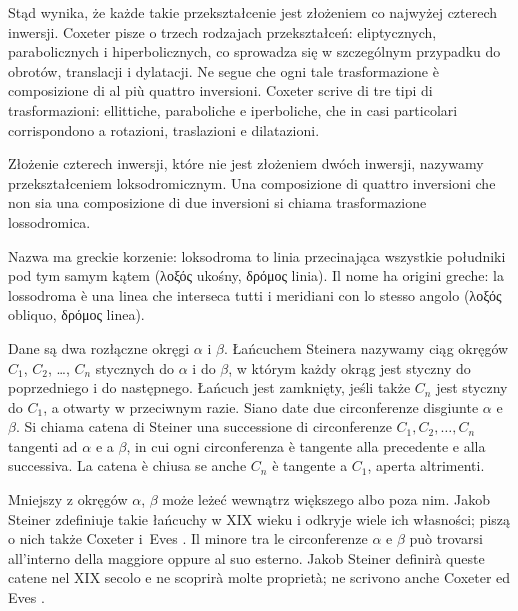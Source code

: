 Stąd wynika, że każde takie przekształcenie jest złożeniem co najwyżej czterech inwersji. %
Coxeter \cite[s. 108]{coxeter_1967} pisze o trzech rodzajach przekształceń: eliptycznych, parabolicznych i hiperbolicznych, co sprowadza się w szczególnym przypadku do obrotów, translacji i dylatacji. %
Ne segue che ogni tale trasformazione è composizione di al più quattro inversioni. %
Coxeter \cite[p. 108]{coxeter_1967} scrive di tre tipi di trasformazioni: ellittiche, paraboliche e iperboliche, che in casi particolari corrispondono a rotazioni, traslazioni e dilatazioni. %

\begin{proposition}
    Złożenie czterech inwersji, które nie jest złożeniem dwóch inwersji, nazywamy przekształceniem loksodromicznym. %
    Una composizione di quattro inversioni che non sia una composizione di due inversioni si chiama trasformazione lossodromica. %
\end{proposition}

Nazwa ma greckie korzenie: loksodroma to linia przecinająca wszystkie południki pod tym samym kątem (λοξός ukośny, δρόμος linia). %
Il nome ha origini greche: la lossodroma è una linea che interseca tutti i meridiani con lo stesso angolo (λοξός obliquo, δρόμος linea). %

\begin{definition}
\label{def:lancuch_steinera}%
    Dane są dwa rozłączne okręgi $\alpha$ i $\beta$. %
    Łańcuchem Steinera nazywamy ciąg okręgów $C_1$, $C_2$, \ldots, $C_n$ stycznych do $\alpha$ i do $\beta$, w którym każdy okrąg jest styczny do poprzedniego i do następnego. %
    Łańcuch jest zamknięty, jeśli także $C_n$ jest styczny do $C_1$, a otwarty w przeciwnym razie. %
    Siano date due circonferenze disgiunte $\alpha$ e $\beta$. %
    Si chiama catena di Steiner una successione di circonferenze $C_1, C_2, \ldots, C_n$ tangenti ad $\alpha$ e a $\beta$, in cui ogni circonferenza è tangente alla precedente e alla successiva. %
    La catena è chiusa se anche $C_n$ è tangente a $C_1$, aperta altrimenti. %
\end{definition}

Mniejszy z okręgów $\alpha$, $\beta$ może leżeć wewnątrz większego albo poza nim. %
Jakob Steiner zdefiniuje takie łańcuchy w XIX wieku i odkryje wiele ich własności; piszą o nich także Coxeter \cite[s. 104]{coxeter_1967} i~Eves \cite[s. 134-135]{eves1_1972}. %
Il minore tra le circonferenze $\alpha$ e $\beta$ può trovarsi all'interno della maggiore oppure al suo esterno. %
Jakob Steiner definirà queste catene nel XIX secolo e ne scoprirà molte proprietà; ne scrivono anche Coxeter \cite[p. 104]{coxeter_1967} ed Eves \cite[p. 134-135]{eves1_1972}. %
%
%
%

